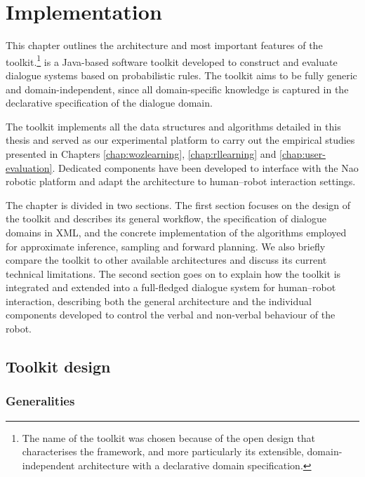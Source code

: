 \chapter{Implementation}
\label{chap:opendial}

This chapter outlines the architecture and most important features of the \opendial{} toolkit.\footnote{The name of the toolkit was chosen because of the open design that characterises the framework, and more particularly its extensible, domain-independent architecture with a declarative domain specification.} \opendial{} is a Java-based software toolkit developed to construct and evaluate dialogue systems based on probabilistic rules. The toolkit aims to be fully generic and domain-independent, since all domain-specific knowledge is captured in the declarative specification of the dialogue domain.

The toolkit implements all the data structures and algorithms detailed in this thesis and served as our experimental platform to carry out the empirical studies presented in Chapters \ref{chap:wozlearning}, \ref{chap:rllearning} and \ref{chap:user-evaluation}. Dedicated components have been developed to interface \opendial{} with the Nao robotic platform and adapt the architecture to human--robot interaction settings.

The chapter is divided in two sections.  The first section focuses on the design of the \opendial{} toolkit and describes its general workflow, the specification of dialogue domains in XML, and the concrete implementation of the algorithms employed for approximate inference, sampling and forward planning. We also briefly compare the toolkit to other available architectures and discuss its current technical limitations.  The second section goes on to explain how the toolkit is integrated and extended into a full-fledged dialogue system for human--robot interaction, describing both the general architecture and the individual components developed to control the verbal and non-verbal behaviour of the robot.  

\section{Toolkit design}
\label{sec:genarchitecture}

\subsection{Generalities}

